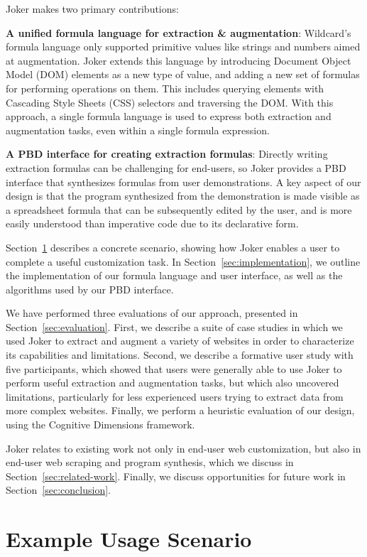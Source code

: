 \documentclass[conference]{IEEEtran}
\begin{document}
Joker makes two primary contributions:

\textbf{A unified formula language for extraction \& augmentation}:
Wildcard's formula language only supported primitive values like strings
and numbers aimed at augmentation. Joker extends this language by
introducing Document Object Model (DOM) elements as a new type of value,
and adding a new set of formulas for performing operations on them. This
includes querying elements with Cascading Style Sheets (CSS) selectors
and traversing the DOM. With this approach, a single formula language is
used to express both extraction and augmentation tasks, even within a
single formula expression.

\textbf{A PBD interface for creating extraction formulas}: Directly
writing extraction formulas can be challenging for end-users, so Joker
provides a PBD interface that synthesizes formulas from user
demonstrations. A key aspect of our design is that the program
synthesized from the demonstration is made visible as a spreadsheet
formula that can be subsequently edited by the user, and is more easily
understood than imperative code due to its declarative form.

Section~\ref{sec:examples} describes a concrete scenario, showing how
Joker enables a user to complete a useful customization task. In
Section~\ref{sec:implementation}, we outline the implementation of our
formula language and user interface, as well as the algorithms used by
our PBD interface.

We have performed three evaluations of our approach, presented in
Section~\ref{sec:evaluation}. First, we describe a suite of case studies
in which we used Joker to extract and augment a variety of websites in
order to characterize its capabilities and limitations. Second, we
describe a formative user study with five participants, which showed
that users were generally able to use Joker to perform useful extraction
and augmentation tasks, but which also uncovered limitations,
particularly for less experienced users trying to extract data from more
complex websites. Finally, we perform a heuristic evaluation of our
design, using the Cognitive Dimensions \citep{blackwell2001} framework.

Joker relates to existing work not only in end-user web customization,
but also in end-user web scraping and program synthesis, which we
discuss in Section~\ref{sec:related-work}. Finally, we discuss
opportunities for future work in Section~\ref{sec:conclusion}.

\hypertarget{sec:examples}{%
\section{Example Usage Scenario}\label{sec:examples}}
\end{document}
